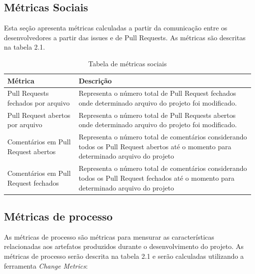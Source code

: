 \subsection{Métricas Sociais}
Esta seção apresenta métricas calculadas a partir da comunicação entre os desenvolvedores a partir das issues e de Pull Requests. As métricas são descritas na tabela 2.1.

\begin{table}[]
\centering
\caption{Tabela de métricas sociais}
\label{metricasociais}
\begin{tabular}{|p{3cm}|p{12cm}|}
\hline
Métrica                                          & Descrição                                                                                                                              \\ \hline
Pull Requests fechados por arquivo               & Representa o número total de Pull Request fechados onde determinado arquivo do projeto foi modificado.                                 \\ \hline
Pull Request abertos por arquivo                 & Representa o número total de Pull Requests abertos onde determinado arquivo do projeto foi modificado.                                 \\ \hline
Comentários em Pull Request abertos  & Representa o número total de comentários considerando todos os Pull Request abertos até o momento para determinado arquivo do projeto  \\ \hline
Comentários em Pull Request fechados & Representa o número total de comentários considerando todos os Pull Request fechados até o momento para determinado arquivo do projeto \\ \hline
\end{tabular}
\end{table}

\subsection{Métricas de processo}
As métricas de processo são métricas para mensurar as características relacionadas aos artefatos produzidos durante o desenvolvimento do projeto. As métricas de processo serão descrita na tabela 2.1 e serão calculadas utilizando a ferramenta \textit{Change Metrics}:

